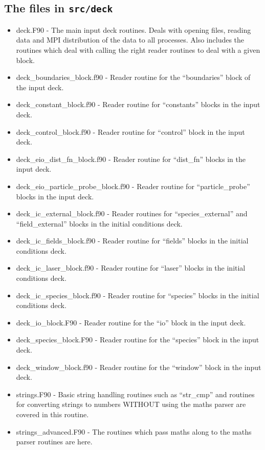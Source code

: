 \documentclass[12pt,a4paper]{article}
\newcommand{\inlinecode}[1]{{\color{warwickred} \bf\texttt{#1}}}
\begin{document}
\subsection{The files in \inlinecode{src/deck}}
\begin{itemize}
\item deck.F90 - The main input deck routines. Deals with opening files,
  reading data and MPI distribution of the data to all processes. Also
  includes the routines which deal with calling the right reader routines to
  deal with a given block.
\item deck\_boundaries\_block.f90 - Reader routine for the ``boundaries'' block
  of the input deck.
\item deck\_constant\_block.f90 - Reader routine for ``constants'' blocks in the
  input deck.
\item deck\_control\_block.f90 - Reader routine for ``control'' block in the
  input deck.
\item deck\_eio\_dist\_fn\_block.f90 - Reader routine for ``dist\_fn'' blocks in
  the input deck.
\item deck\_eio\_particle\_probe\_block.f90 - Reader routine for
  ``particle\_probe'' blocks in the input deck.
\item deck\_ic\_external\_block.f90 - Reader routines for ``species\_external''
  and ``field\_external'' blocks in the initial conditions deck.
\item deck\_ic\_fields\_block.f90 - Reader routine for ``fields'' blocks in the
  initial conditions deck.
\item deck\_ic\_laser\_block.f90 - Reader routine for ``laser'' blocks in the
  initial conditions deck.
\item deck\_ic\_species\_block.f90 - Reader routine for ``species'' blocks in
  the initial conditions deck.
\item deck\_io\_block.F90 - Reader routine for the ``io'' block in the input
  deck.
\item deck\_species\_block.F90 - Reader routine for the ``species'' block in the
  input deck.
\item deck\_window\_block.f90 - Reader routine for the ``window'' block in the
  input deck.
\item strings.F90 - Basic string handling routines such as ``str\_cmp'' and
  routines for converting strings to numbers WITHOUT using the maths parser
  are covered in this routine.
\item strings\_advanced.F90 - The routines which pass maths along to the maths
  parser routines are here.
\end{itemize}
\end{document}
